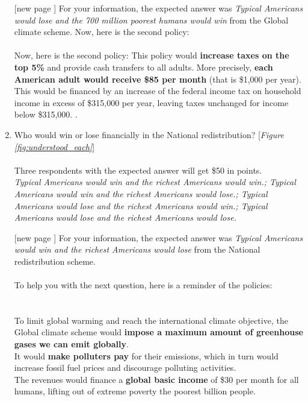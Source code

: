 \begin{enumerate}[resume]
\item[[new page\!\!\!]] For your information, the expected answer was \textit{Typical Americans would lose and the 700 million poorest humans would win} from the Global climate scheme. Now, here is the second policy: \\ 
\\
Now, here is the second policy:  \textbf{} This policy would \textbf{increase taxes on the top 5\%} and provide cash transfers to all adults. More precisely, \textbf{each American adult would receive \$85 per month} (that is \$1,000 per year). This would be financed by an increase of the federal income tax on household income in excess of \$315,000 per year, leaving taxes unchanged for income below \$315,000. .
\item \label{q:understood_nr} Who would win or lose financially in the National redistribution? [\textit{Figure \ref{fig:understood_each}}] \\
\\
Three respondents with the expected answer will get \$50 in points.
\\ \textit{Typical Americans would win and the richest Americans would win.; Typical Americans would win and the richest Americans would lose.; Typical Americans would lose and the richest Americans would win.; Typical Americans would lose and the richest Americans would lose.}
\item[[new page\!\!\!]] For your information, the expected answer was \textit{Typical Americans would win and the richest Americans would lose} from the National redistribution scheme. \\ 
\\
To help you with the next question, here is a reminder of the policies:\\
\\
\textbf{}\\ 
To limit global warming and reach the international climate objective, the Global climate scheme would \textbf{impose a maximum amount of greenhouse gases we can emit globally}.\\
It would \textbf{make polluters pay} for their emissions, which in turn would increase fossil fuel prices and discourage polluting activities.\\
The revenues would finance a \textbf{global basic income} of \$30 per month for all humans, lifting out of extreme poverty the poorest billion people.\\

\end{enumerate}

